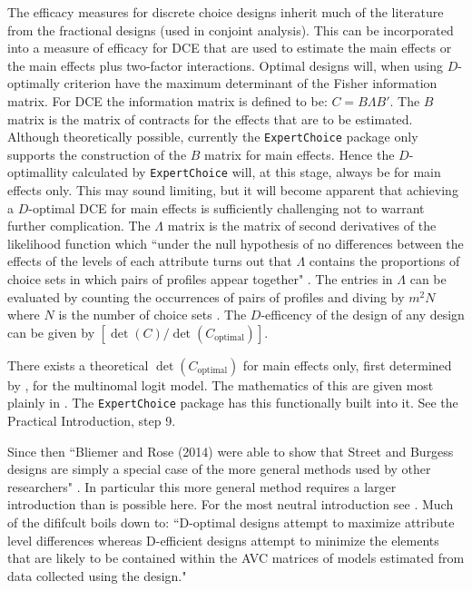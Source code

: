 \documentclass{article}
\begin{document}
The efficacy measures for discrete choice designs inherit much of the literature from the fractional designs (used in conjoint analysis).
This can be incorporated into a measure of efficacy for DCE that are used to estimate the main effects or the main effects plus two-factor interactions.
Optimal designs will, when using $D$-optimally criterion have the maximum determinant of the Fisher information matrix.
For DCE the information matrix is defined to be: $C = B\Lambda B'$.
The $B$ matrix is the matrix of contracts for the effects that are to be estimated.
Although theoretically possible, currently the \texttt{ExpertChoice} package only supports the construction of the $B$ matrix for main effects.
Hence the $D$-optimallity calculated by \texttt{ExpertChoice} will, at this stage, always be for main effects only.
This may sound limiting, but it will become apparent that achieving a $D$-optimal DCE for main effects is sufficiently challenging not to warrant further complication.
The $\Lambda$ matrix is the matrix of second derivatives of the likelihood function which ``under the null hypothesis of no differences between the effects of the levels of each attribute turns out that $\Lambda$ contains the proportions of choice sets in which pairs of profiles appear together" \citep[462]{street2007construction}.
The entries in $\Lambda$ can be evaluated by counting the occurrences of pairs of profiles and diving by $m^2N$ where $N$ is the number of choice sets \citep[462]{street2007construction}.
The $D$-efficency of the design of any design can be given by $[\det(C)/\det(C_{\text{optimal}})]$.

There exists a theoretical $\det(C_{\text{optimal}})$ for main effects only, first determined by \citet{burgess2005optimal}, for the multinomal logit model.
The mathematics of this are given most plainly in \citet{street2007construction}.
The \texttt{ExpertChoice} package has this functionally built into it.
See the Practical Introduction, step 9.

Since then ``Bliemer and Rose (2014) were able to show that Street and
Burgess designs are simply a special case of the more general methods used by
other researchers" \citep[310]{hensherrosegreene2015}.
In particular this more general method requires a larger introduction than is possible here.
For the most neutral introduction see \citet{walker2018d}.
Much of the dififcult boils down to:
``D-optimal designs attempt to maximize attribute level differences whereas
D-efficient designs attempt to minimize the elements that are likely to be
contained within the AVC matrices of models estimated from data collected using
the design." \citep{rose2009efficient-stated-choice}
\end{document}

